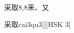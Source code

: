 \begin{entry}{采取}{8,8}{⾤、⼜}
  \begin{phonetics}{采取}{cai3qu3}[][HSK 3]
  \end{phonetics}
\end{entry}
